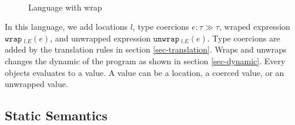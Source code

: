 \documentclass{article}
\newcommand{\keywadj}[1]{\mathtt{#1}}
\newcommand{\keyw}[1]{\keywadj{#1}~}
\begin{document}
\begin{figure}[H]
{\[\begin{array}{lll}
\begin{array}{lllr}
\
\end{array}
\end{array}
\]
}
\caption{Language with wrap}
\end{figure}

In this language, we add locations $l$, type coercions $e: \tau \gg \tau$, wraped expression $\keyw{wrap}_{l.E}(e)$, and unwrapped expression $\keyw{unwrap}_{l.E}(e)$. Type coercions are added by the translation rules in section \ref{sec-translation}. Wraps and unwraps changes the dynamic of the program as shown in section \ref{sec-dynamic}. Every objects evaluates to a value. A value can be a location, a coerced value, or an unwrapped value.


\subsection{ Static Semantics}
\end{document}
